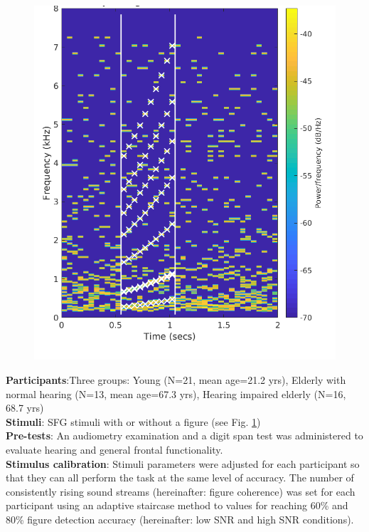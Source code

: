 \documentclass[a0,portrait]{a0poster}
\begin{document}
\begin{multicols}{2}
\setlength{\columnsep}{60pt}
\begin{figure}
	\begin{center}
		\includegraphics[width=1\linewidth]{sfg_stimulus.png}
		\label{fig:stimulus}
	\end{center}
\end{figure}

\textbf{Participants}:Three groups: Young (N=21, mean age=21.2 yrs), Elderly with normal hearing (N=13, mean age=67.3 yrs), Hearing impaired elderly (N=16, 68.7 yrs)\\
\textbf{Stimuli}: SFG stimuli with or without a figure (see Fig. \ref{fig:stimulus})\\
\textbf{Pre-tests}: An audiometry examination and a digit span test was administered to evaluate hearing and general frontal functionality.\\
\textbf{Stimulus calibration}: Stimuli parameters were adjusted for each participant so that they can all perform the task at the same level of accuracy. The number of consistently rising sound streams (hereinafter: figure coherence) was set for each participant using an adaptive staircase method to values for reaching 60\% and 80\% figure detection accuracy (hereinafter: low SNR and high SNR conditions).


\end{multicols}
\end{document}
